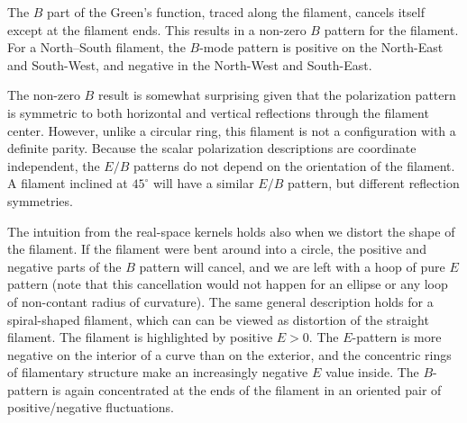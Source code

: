 The $B$ part of the Green's function, traced along the filament, cancels itself except at the filament ends.  This results in a non-zero $B$ pattern for the filament.  For a North--South filament, the $B$-mode pattern is positive on the North-East and South-West, and negative in the North-West and South-East.


The non-zero $B$ result is somewhat surprising given that the polarization pattern is symmetric to both horizontal and vertical reflections through the filament center.  However, unlike a circular ring, this filament is not a configuration with a definite parity.  Because the scalar polarization descriptions are coordinate independent, the $E/B$ patterns do not depend on the orientation of the filament.  A filament inclined at $45^\circ$ will have a similar $E/B$ pattern, but different reflection symmetries.  


The intuition from the real-space kernels holds also when we distort the shape of the filament.  If the filament were bent around into a circle, the positive and negative parts of the $B$ pattern will cancel, and we are left with a hoop of pure $E$ pattern (note that this cancellation would not happen for an ellipse or any loop of non-contant radius of curvature).  The same general description holds for a spiral-shaped filament, which can can be viewed as distortion of the straight filament.  The filament is highlighted by positive $E>0$.  The $E$-pattern is more negative on the interior of a curve than on the exterior, and the concentric rings of filamentary structure make an increasingly negative $E$ value inside.  The $B$-pattern is again concentrated at the ends of the filament in an oriented pair of positive/negative fluctuations.  

